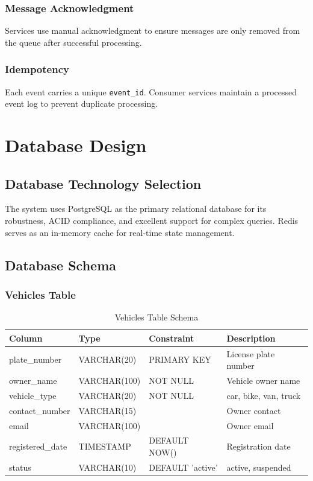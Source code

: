 \documentclass[12pt,a4paper]{report}
\begin{document}
\subsection{Message Acknowledgment}
Services use manual acknowledgment to ensure messages are only removed from the queue after successful processing.

\subsection{Idempotency}
Each event carries a unique \texttt{event\_id}. Consumer services maintain a processed event log to prevent duplicate processing.


\chapter{Database Design}

\section{Database Technology Selection}

The system uses PostgreSQL as the primary relational database for its robustness, ACID compliance, and excellent support for complex queries. Redis serves as an in-memory cache for real-time state management.

\section{Database Schema}

\subsection{Vehicles Table}

\begin{table}[H]
\centering
\caption{Vehicles Table Schema}
\begin{tabular}{|l|l|l|l|}
\hline
\textbf{Column} & \textbf{Type} & \textbf{Constraint} & \textbf{Description} \\
\hline
plate\_number & VARCHAR(20) & PRIMARY KEY & License plate number \\
\hline
owner\_name & VARCHAR(100) & NOT NULL & Vehicle owner name \\
\hline
vehicle\_type & VARCHAR(20) & NOT NULL & car, bike, van, truck \\
\hline
contact\_number & VARCHAR(15) & & Owner contact \\
\hline
email & VARCHAR(100) & & Owner email \\
\hline
registered\_date & TIMESTAMP & DEFAULT NOW() & Registration date \\
\hline
status & VARCHAR(10) & DEFAULT 'active' & active, suspended \\
\hline
\end{tabular}
\end{table}
\end{document}
